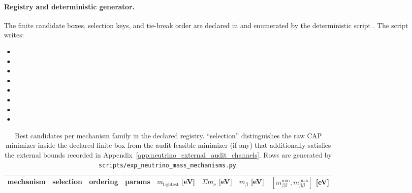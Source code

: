 \paragraph{Registry and deterministic generator.}
\AuditTag The finite candidate boxes, selection keys, and tie-break order are declared in
 and enumerated by the deterministic script
.
The script writes:
\begin{itemize}
\item {}
\item {}
\item {}
\item {}
\item {}
\item {}
\item {}
\item {}
\end{itemize}

\begin{table}[t]
\centering
\scriptsize
\setlength{\tabcolsep}{5pt}
\renewcommand{\arraystretch}{1.15}
\begin{tabular}{llllrrrr}
\toprule
mechanism & selection & ordering & params &
$m_{\mathrm{lightest}}$ [eV] & $\Sigma m_\nu$ [eV] & $m_\beta$ [eV] & $[m_{\beta\beta}^{\min},m_{\beta\beta}^{\max}]$ [eV] \\
\midrule
%
\end{tabular}
\caption{Best candidates per mechanism family in the declared registry. ``selection'' distinguishes the raw CAP minimizer inside the declared finite box from the audit-feasible minimizer (if any) that additionally satisfies the external bounds recorded in Appendix~\ref{app:neutrino_external_audit_channels}. Rows are generated by \texttt{scripts/exp\_neutrino\_mass\_mechanisms.py}.}
\label{tab:neutrino_mechanism_candidates}
\end{table}

